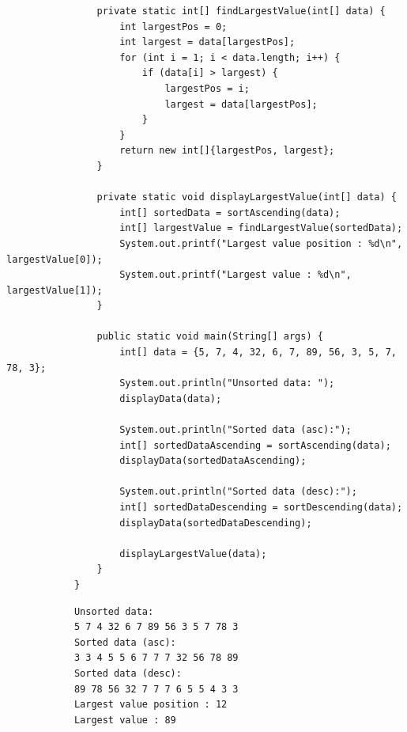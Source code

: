 \documentclass[12pt,titlepage]{article}
\begin{document}
\begin{enumerate}
\begin{itemize}
\begin{verbatim}
                private static int[] findLargestValue(int[] data) {
                    int largestPos = 0;
                    int largest = data[largestPos];
                    for (int i = 1; i < data.length; i++) {
                        if (data[i] > largest) {
                            largestPos = i;
                            largest = data[largestPos];
                        }
                    }
                    return new int[]{largestPos, largest};
                }

                private static void displayLargestValue(int[] data) {
                    int[] sortedData = sortAscending(data);
                    int[] largestValue = findLargestValue(sortedData);
                    System.out.printf("Largest value position : %d\n", largestValue[0]);
                    System.out.printf("Largest value : %d\n", largestValue[1]);
                }

                public static void main(String[] args) {
                    int[] data = {5, 7, 4, 32, 6, 7, 89, 56, 3, 5, 7, 78, 3};
                    System.out.println("Unsorted data: ");
                    displayData(data);
                    
                    System.out.println("Sorted data (asc):");
                    int[] sortedDataAscending = sortAscending(data);
                    displayData(sortedDataAscending);

                    System.out.println("Sorted data (desc):");
                    int[] sortedDataDescending = sortDescending(data);
                    displayData(sortedDataDescending);

                    displayLargestValue(data);
                }
            }
        \end{verbatim}
        \begin{verbatim}
            Unsorted data:
            5 7 4 32 6 7 89 56 3 5 7 78 3
            Sorted data (asc):
            3 3 4 5 5 6 7 7 7 32 56 78 89
            Sorted data (desc):
            89 78 56 32 7 7 7 6 5 5 4 3 3
            Largest value position : 12
            Largest value : 89
        \end{verbatim}
    \end{itemize}
\end{enumerate}
\end{document}
